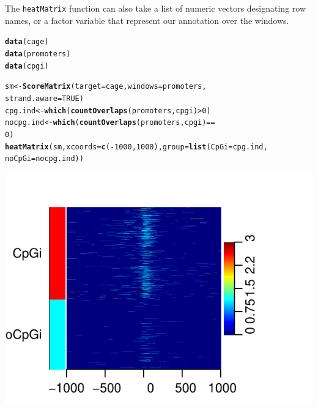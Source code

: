 \documentclass{article}\usepackage[]{graphicx}\usepackage[]{color}
\makeatletter
\def\maxwidth{ %
  \ifdim\Gin@nat@width>\linewidth
    \linewidth
  \else
    \Gin@nat@width
  \fi
}
\newcommand{\hlnum}[1]{\textcolor[rgb]{0.686,0.059,0.569}{#1}}%
\newcommand{\hlopt}[1]{\textcolor[rgb]{0,0,0}{#1}}%
\newcommand{\hlstd}[1]{\textcolor[rgb]{0.345,0.345,0.345}{#1}}%
\newcommand{\hlkwb}[1]{\textcolor[rgb]{0.69,0.353,0.396}{#1}}%
\newcommand{\hlkwc}[1]{\textcolor[rgb]{0.333,0.667,0.333}{#1}}%
\newcommand{\hlkwd}[1]{\textcolor[rgb]{0.737,0.353,0.396}{\textbf{#1}}}%
\newenvironment{kframe}{%
 \def\at@end@of@kframe{}%
 \ifinner\ifhmode%
  \def\at@end@of@kframe{\end{minipage}}%
  \begin{minipage}{\columnwidth}%
 \fi\fi%
 \def\FrameCommand##1{\hskip\@totalleftmargin \hskip-\fboxsep
 \colorbox{shadecolor}{##1}\hskip-\fboxsep
     \hskip-\linewidth \hskip-\@totalleftmargin \hskip\columnwidth}%
 \MakeFramed {\advance\hsize-\width
   \@totalleftmargin\z@ \linewidth\hsize
   \@setminipage}}%
 {\par\unskip\endMakeFramed%
 \at@end@of@kframe}
\newenvironment{knitrout}{}{} %
\newcommand{\Rcode}[1]{{\texttt{#1}}}
\makeatother
\begin{document}
The \Rcode{heatMatrix} function can also take a list of numeric vectors 
designating row names, or a factor variable that represent our 
annotation over the windows.
\begin{knitrout}
\color{fgcolor}\begin{kframe}
\begin{alltt}
\hlkwd{data}\hlstd{(cage)}
\hlkwd{data}\hlstd{(promoters)}
\hlkwd{data}\hlstd{(cpgi)}

\hlstd{sm} \hlkwb{<-} \hlkwd{ScoreMatrix}\hlstd{(}\hlkwc{target} \hlstd{= cage,} \hlkwc{windows} \hlstd{= promoters,}
    \hlkwc{strand.aware} \hlstd{=} \hlnum{TRUE}\hlstd{)}
\hlstd{cpg.ind} \hlkwb{<-} \hlkwd{which}\hlstd{(}\hlkwd{countOverlaps}\hlstd{(promoters, cpgi)} \hlopt{>} \hlnum{0}\hlstd{)}
\hlstd{nocpg.ind} \hlkwb{<-} \hlkwd{which}\hlstd{(}\hlkwd{countOverlaps}\hlstd{(promoters, cpgi)} \hlopt{==}
    \hlnum{0}\hlstd{)}
\hlkwd{heatMatrix}\hlstd{(sm,} \hlkwc{xcoords} \hlstd{=} \hlkwd{c}\hlstd{(}\hlopt{-}\hlnum{1000}\hlstd{,} \hlnum{1000}\hlstd{),} \hlkwc{group} \hlstd{=} \hlkwd{list}\hlstd{(}\hlkwc{CpGi} \hlstd{= cpg.ind,}
    \hlkwc{noCpGi} \hlstd{= nocpg.ind))}
\end{alltt}
\end{kframe}

{\centering \includegraphics[width=\maxwidth]{FiguresheatMatrix2} 

}



\end{knitrout}
\end{document}
